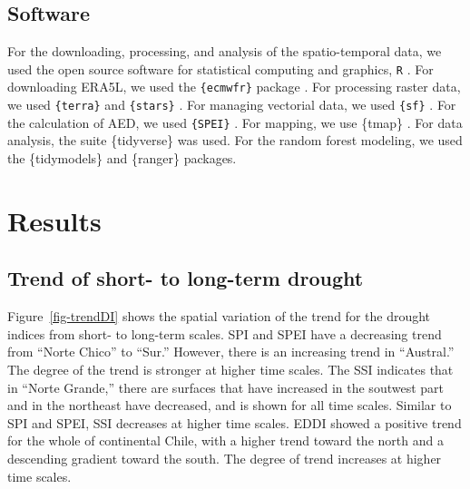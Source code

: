 \documentclass[
  authoryear,
  preprint,
  3p,
  onecolumn]{elsarticle}
\begin{document}
\hypertarget{software}{%
\subsection{Software}\label{software}}

For the downloading, processing, and analysis of the spatio-temporal
data, we used the open source software for statistical computing and
graphics, \texttt{R} \citep{R2023}. For downloading ERA5L, we used the
\texttt{\{ecmwfr\}} package \citep{Hufkens2019}. For processing raster
data, we used \texttt{\{terra\}} \citep{Hijmans2023} and
\texttt{\{stars\}} \citep{Pebesma2023}. For managing vectorial data, we
used \texttt{\{sf\}} \citep{Pebesma2018}. For the calculation of AED, we
used \texttt{\{SPEI\}} \citep{Bergueria2023}. For mapping, we use
\{tmap\} \citep{Tennekes2018}. For data analysis, the suite
\{tidyverse\} \citep{Wickham2019} was used. For the random forest
modeling, we used the \{tidymodels\}\citep{Kuhn2020} and
\{ranger\}\citep{Wright2017} packages.

\hypertarget{results}{%
\section{Results}\label{results}}

\hypertarget{trend-of-short--to-long-term-drought-1}{%
\subsection{Trend of short- to long-term
drought}\label{trend-of-short--to-long-term-drought-1}}

Figure~\ref{fig-trendDI} shows the spatial variation of the trend for
the drought indices from short- to long-term scales. SPI and SPEI have a
decreasing trend from ``Norte Chico'' to ``Sur.'' However, there is an
increasing trend in ``Austral.'' The degree of the trend is stronger at
higher time scales. The SSI indicates that in ``Norte Grande,'' there
are surfaces that have increased in the soutwest part and in the
northeast have decreased, and is shown for all time scales. Similar to
SPI and SPEI, SSI decreases at higher time scales. EDDI showed a
positive trend for the whole of continental Chile, with a higher trend
toward the north and a descending gradient toward the south. The degree
of trend increases at higher time scales.

\blandscape
\end{document}
